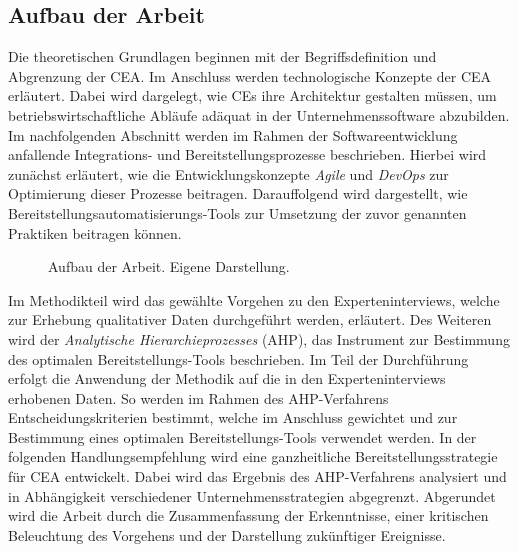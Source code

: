 \subsection{Aufbau der Arbeit}
Die theoretischen Grundlagen beginnen mit der Begriffsdefinition und Abgrenzung der CEA. Im Anschluss werden technologische Konzepte der CEA erläutert. Dabei wird dargelegt, wie CEs ihre Architektur gestalten müssen, um betriebswirtschaftliche Abläufe adäquat in der Unternehmenssoftware abzubilden. Im nachfolgenden Abschnitt werden im Rahmen der Softwareentwicklung anfallende Integrations- und Bereitstellungsprozesse beschrieben. Hierbei wird zunächst erläutert, wie die Entwicklungskonzepte \textit{Agile} und \textit{DevOps} zur Optimierung dieser Prozesse beitragen. Darauffolgend wird dargestellt, wie Bereitstellungsautomatisierungs-Tools zur Umsetzung der zuvor genannten Praktiken beitragen können.
\begin{center}
	\begin{figure}[H]
		\centering
		\caption[Aufbau der Arbeit]{Aufbau der Arbeit. Eigene Darstellung.}
		\label{fig:Aufbau}
	\end{figure}	
\end{center}
\vspace*{-15mm}
Im Methodikteil wird das gewählte Vorgehen zu den Experteninterviews, welche zur Erhebung qualitativer Daten durchgeführt werden, erläutert. Des Weiteren wird der \textit{Analytische Hierarchieprozesses} (\acs{AHP}), das Instrument zur Bestimmung des optimalen Bereitstellungs-Tools beschrieben. Im Teil der Durchführung erfolgt die Anwendung der Methodik auf die in den Experteninterviews erhobenen Daten. So werden im Rahmen des AHP-Verfahrens Entscheidungskriterien bestimmt, welche im Anschluss gewichtet und zur Bestimmung eines optimalen Bereitstellungs-Tools verwendet werden. In der folgenden Handlungsempfehlung wird eine ganzheitliche Bereitstellungsstrategie für CEA  entwickelt. Dabei wird das Ergebnis des AHP-Verfahrens analysiert und in Abhängigkeit verschiedener Unternehmensstrategien abgegrenzt. Abgerundet wird die Arbeit durch die Zusammenfassung der Erkenntnisse, einer kritischen Beleuchtung des Vorgehens und der Darstellung zukünftiger Ereignisse. 
